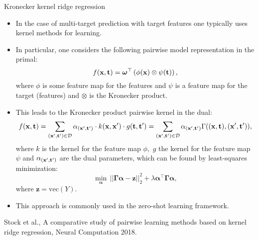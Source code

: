 \documentclass[11pt,compress,t,notes=noshow, xcolor=table]{beamer}
\newcommand{\tv}{\mathbf{t}}
\begin{document}
\begin{frame}{Kronecker kernel ridge regression}
	\footnotesize
	\begin{itemize}
%		
	\item In the case of multi-target prediction with target features one typically uses kernel methods for learning.
%		
	\item In particular, one considers the following pairwise model representation in the primal: 
		\begin{equation*}
			\label{eq:pairwise}
			f(\xv,\tv) = \bm\omega^\top \left(\phi(\xv) \otimes \psi(\tv) \right) ,
		\end{equation*}
%	
	where $\phi$ is some feature map for the features and $\psi$ is a feature map for the target (features) and $\otimes$ is the Kronecker product.
%
	\item This leads to the Kronecker product pairwise kernel in the dual:
%	
	\begin{eqnarray*} 
		f(\xv,\tv)= \sum_{(\xv',\tv') \in \D} \alpha_{(\xv',\tv')}  \cdot  k(\xv,\xv') \cdot g(\tv,\tv')  = \sum_{(\xv',\tv') \in \D} \alpha_{(\xv',\tv')} \Gamma((\xv,\tv),(\xv',\tv')),
	\end{eqnarray*}
%
	where $k$ is the kernel for the feature map $\phi,$  $g$ the kernel for the feature map $\psi$  and $\alpha_{(\xv',\tv')}$ are the dual parameters, which can be found by least-squares minimization:
%	 
	$$ \min_{\bm{\alpha}} \, ||\bm{\Gamma}\bm{\alpha} -\bm{z} ||^2_2 +\lambda\bm{\alpha }^\top \bm{\Gamma}\bm{\alpha}, $$
%	
	where $\bm{z} = \mathrm{vec}{(Y)}.$
%
%
	\item This approach is commonly used in the zero-shot learning framework.

%
\end{itemize}
%	
	{\tiny Stock et al., A comparative study of pairwise learning methods based on kernel ridge regression, Neural Computation 2018.}
%	
\end{frame}
\end{document}
